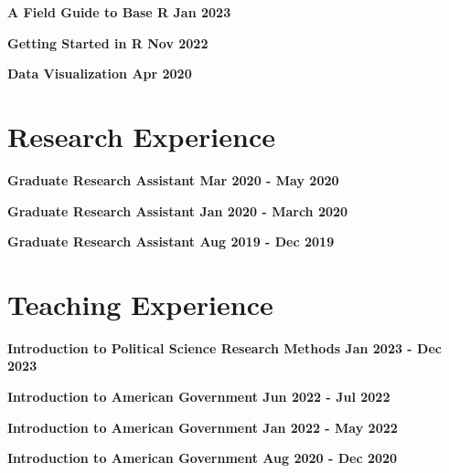 \documentclass[margin]{res}
\newcommand{\fullhrulefill}{%
  \hspace*{-\sectionwidth}\hrulefill%
  }
\begin{document}
\begin{resume}
\textbf{A Field Guide to Base R \hfill{Jan 2023} \\}

\textbf{Getting Started in R \hfill{Nov 2022} \\}

\textbf{Data Visualization \hfill{Apr 2020} \\}


\fullhrulefill
\section{ Research Experience}

\textbf {Graduate Research Assistant \hfill {Mar 2020 - May 2020} \\ }

\textbf {Graduate Research Assistant \hfill {Jan 2020 - March 2020} \\ }

\textbf {Graduate Research Assistant \hfill {Aug 2019 - Dec 2019} \\ }


\fullhrulefill

\section {Teaching Experience}

\textbf {Introduction to Political Science Research Methods \hfill {Jan 2023 - Dec 2023} \\ }

\textbf {Introduction to American Government \hfill {Jun 2022 - Jul 2022} \\ }

\textbf {Introduction to American Government \hfill {Jan 2022 - May 2022} \\ }


\textbf {Introduction to American Government \hfill {Aug 2020 - Dec 2020} \\ }


\end{resume}
\end{document}
